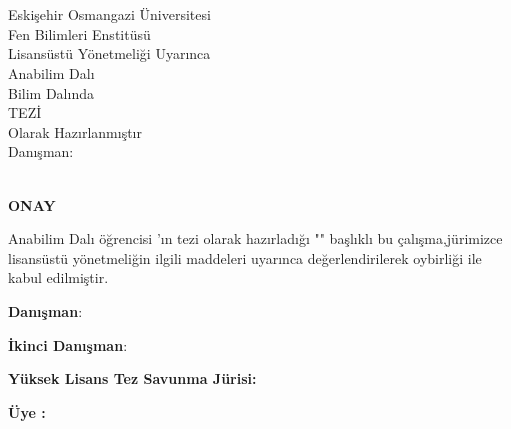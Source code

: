 \documentclass[]{esogu}			%
\begin{document}
\begin{titlingpage*}
\begin{center}
\vspace*{10mm}
\tbaslik\\								%
\vspace{12pc}							%
\yazar	\\								%
\vspace{8pc}							%
Eskişehir Osmangazi Üniversitesi\\		
Fen Bilimleri Enstitüsü\\
Lisansüstü Yönetmeliği Uyarınca\\
\bolum \space Anabilim Dalı\\
\bilim \space Bilim Dalında\\
\unvan \space TEZİ\\
Olarak Hazırlanmıştır\\
\vspace{7pc}
Danışman:\space \danisman\\			
\vfill
\vspace{1pc}
\teslim\\
\vspace{2cm}
\end{center}

\end{titlingpage*}
\normalsize

\thispagestyle{empty}
\begin{center}
\large
\textbf{ONAY} 
\normalsize
\end{center}

\bolum \space Anabilim Dalı \unvan \space öğrencisi \yazar'ın \space \unvan\space tezi olarak hazırladığı "\textbf{\tbaslik}" başlıklı bu çalışma,\space jürimizce lisansüstü yönetmeliğin ilgili maddeleri uyarınca değerlendirilerek oybirliği ile kabul edilmiştir.
\vspace{15mm}

\noindent \textbf{Danışman}\space\space\space\space\space\space\space\space:\space \danisman 

\noindent \textbf{İkinci Danışman}\space:\space \ikidanisman
\newline

\noindent \textbf{Yüksek Lisans Tez Savunma Jürisi:}

\noindent \textbf{Üye :\space}\jbir
\end{document}
